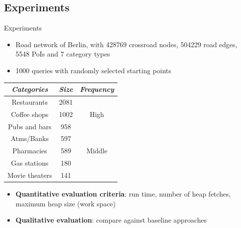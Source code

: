 \documentclass[18pt]{beamer}
\begin{document}
	\subsection{Experiments}
		\begin{frame}{Experiments}
		
			\begin{itemize}
				\item Road network of Berlin, with 428769
				crossroad nodes, 504229 road edges, 5548 PoIs and 7 category types
				\item 1000 queries with randomly selected
				starting points
			\end{itemize}
		
			\begin{table}[H]
				\centering
				\begin{tabular}{ |c|c|c| } 
					\hline
					\textit{Categories} & \textit{Size} & \textit{Frequency}\\
					\hline
					Restaurants & 2081 & \multirow{3}{3em}{High}\\ 
					Coffee shops & 1002 &\\
					Pubs and bars & 958 &\\  
					\hline
					Atms/Banks & 597 & \multirow{3}{3em}{Middle}\\
					Pharmacies & 589 &\\
					\hline
					Gas stations & 180 & \multirow{3}{3em}{Low}\\
					Movie theaters & 141 &\\ 
					\hline
				\end{tabular}
				
			\end{table}
	
			\begin{itemize}
				\item \textbf{Quantitative evaluation criteria}: run time, number of heap fetches, maximum heap size (work space)
				\item \textbf{Qualitative evaluation}: compare against baseline approaches
			\end{itemize}
		
		\end{frame}
\end{document}
